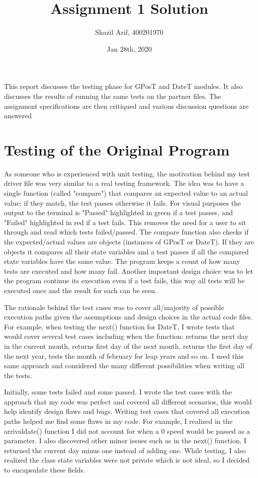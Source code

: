 \documentclass[12pt]{article}
\title{Assignment 1 Solution}
\author{Shazil Arif, 400201970}
\date{Jan 28th, 2020}
\begin{document}
\maketitle

This report discusses the testing phase for GPosT and DateT modules. It also 
discusses the results of running the same tests on the partner files. The assignment specifications are then critiqued and various discussion questions are answered

\section{Testing of the Original Program}

As someone who is experienced with unit testing, the motivation behind my test driver file was very similar to a real testing framework. The idea was to have a single function (called "compare") that compares an expected value to 
an actual value; if they match, the test passes otherwise it fails. For visual purposes the output to the terminal is "Passed" highlighted in green if a test passes, and "Failed" highlighted in red if a test fails. This removes the need for a user to sit through and read which tests failed/passed. The compare function also checks if the expected/actual values are objects (instances of GPosT or DateT). If they are objects it compares all their state variables and a test passes if all the compared state variables have the same value. The program keeps a count of how many tests are executed and how many fail. Another important design choice was to let the program continue its execution even if a test fails, this way all tests will be executed once and the result for each can be seen.

The rationale behind the test cases was to cover all/majority of possible execution paths given the assumptions and design choices in the actual code files. For example, when testing the next() function for DateT, I wrote tests that would cover several test cases including when the function: returns the next day in the current month, returns first day of the next month, returns the first day of the next year, tests the month of february for leap years and so on. I used this same approach and considered the many different possibilities when writing all the tests. 

Initially, some tests failed and some passed. I wrote the test cases with the approach that my code was perfect and covered all different scenarios, this would help identify design flaws and bugs. Writing test cases that covered all execution paths helped me find some flaws in my code. For example, I realized in the arrivaldate() function I did not account for when a 0 speed would be passed as a parameter. I also discovered other minor issues such as in the next() function, I returned the current day minus one instead of adding one. While testing, I also realized the class state variables were not private which is not ideal, so I decided to encapsulate these fields.
\end{document}
